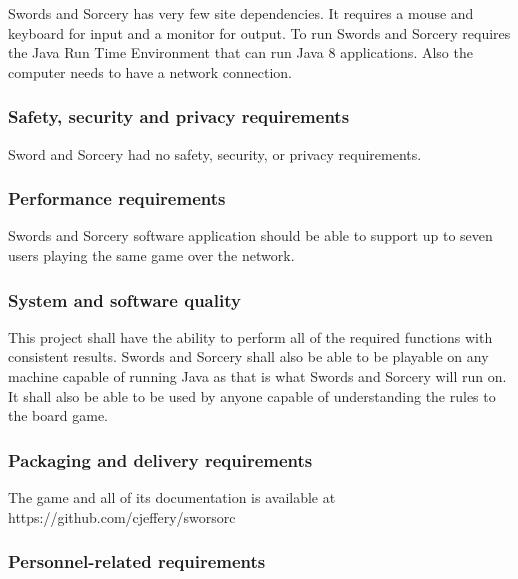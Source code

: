 \documentclass[twoside,letterpaper,pdftex]{article}
\begin{document}
Swords and Sorcery has very few site dependencies. It requires a mouse and keyboard for input and a monitor for output. To run Swords and Sorcery requires the Java Run Time Environment that can run Java 8 applications. Also the computer needs to have a network connection.

\subsubsection[Safety, security and privacy requirements]{\rmfamily\bfseries
Safety, security and privacy requirements}
\hypertarget{RefHeading18659017292}{}{\itshape
}

Sword and Sorcery had no safety, security, or privacy requirements.

\subsubsection[Performance requirements]{\rmfamily\bfseries Performance
requirements}
\hypertarget{RefHeading18859017292}{}{\itshape
}

Swords and Sorcery software application should be able to support up to seven users playing the same
game over the network.

\subsubsection[System and software quality]{\rmfamily\bfseries System and software
quality}
\hypertarget{RefHeading19059017292}{}{\itshape
}

This project shall have the ability to perform all of the required functions with consistent results. Swords and Sorcery shall also be able to be playable on any machine capable of running Java as that is what Swords and Sorcery will run on. It shall also be able to be used by anyone capable of understanding the rules to the board game.


\subsubsection[Packaging and delivery requirements]{\rmfamily\bfseries
Packaging and delivery requirements}
\hypertarget{RefHeading19259017292}{}{\itshape
}

The game and all of its documentation is available at https://github.com/cjeffery/sworsorc

\subsubsection[Personnel{}-related requirements]{\rmfamily\bfseries
Personnel-related requirements}
\hypertarget{RefHeading19459017292}{}{
{\textit{ }}\foreignlanguage{english}{ }}
\end{document}

